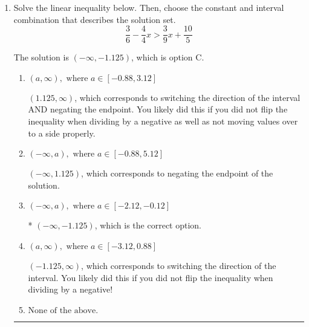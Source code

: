 \documentclass{extbook}[14pt]
\newcommand{\litem}[1]{\item #1

\rule{\textwidth}{0.4pt}}
\begin{document}
\begin{enumerate}
{\begin{enumerate}[label=\Alph*.]
$[-14.00, -1.53)$, which is the correct option.
\item \( (-\infty, a) \cup [b, \infty), \text{ where } a \in [-17, -13] \text{ and } b \in [-2.53, 1.47] \)

$(-\infty, -14.00) \cup [-1.53, \infty)$, which corresponds to displaying the and-inequality as an or-inequality AND flipping the inequality.
\item \( (a, b], \text{ where } a \in [-14, -10] \text{ and } b \in [-2.53, 1.47] \)

$(-14.00, -1.53]$, which corresponds to flipping the inequality.
\item \( \text{None of the above.} \)


\end{enumerate}

\textbf{General Comment:} To solve, you will need to break up the compound inequality into two inequalities. Be sure to keep track of the inequality! It may be best to draw a number line and graph your solution.
}
\litem{
Solve the linear inequality below. Then, choose the constant and interval combination that describes the solution set.
\[ \frac{3}{6} - \frac{4}{4} x > \frac{3}{9} x + \frac{10}{5} \]

The solution is \( (-\infty, -1.125) \), which is option C.\begin{enumerate}[label=\Alph*.]
\item \( (a, \infty), \text{ where } a \in [-0.88, 3.12] \)

 $(1.125, \infty)$, which corresponds to switching the direction of the interval AND negating the endpoint. You likely did this if you did not flip the inequality when dividing by a negative as well as not moving values over to a side properly.
\item \( (-\infty, a), \text{ where } a \in [-0.88, 5.12] \)

 $(-\infty, 1.125)$, which corresponds to negating the endpoint of the solution.
\item \( (-\infty, a), \text{ where } a \in [-2.12, -0.12] \)

* $(-\infty, -1.125)$, which is the correct option.
\item \( (a, \infty), \text{ where } a \in [-3.12, 0.88] \)

 $(-1.125, \infty)$, which corresponds to switching the direction of the interval. You likely did this if you did not flip the inequality when dividing by a negative!
\item \( \text{None of the above}. \)


\end{enumerate}}
\end{enumerate}
\end{document}

